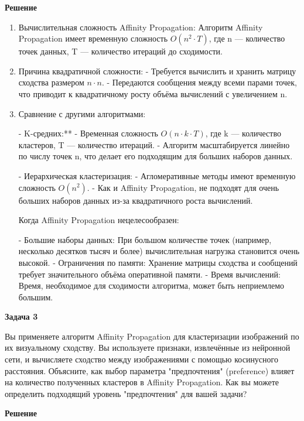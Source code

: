 \textbf{Решение}
\begin{enumerate}
    \item Вычислительная сложность Affinity Propagation: Алгоритм Affinity Propagation имеет временную сложность $O(n^2 \cdot T)$, где n — количество точек данных, T — количество итераций до сходимости.

    \item Причина квадратичной сложности:
        - Требуется вычислить и хранить матрицу сходства размером $n \cdot n$.
        - Передаются сообщения между всеми парами точек, что приводит к квадратичному росту объёма вычислений с увеличением n.

    \item Сравнение с другими алгоритмами:

- K-средних:**
  - Временная сложность $O(n \cdot k \cdot T)$, где k — количество кластеров, T — количество итераций.
  - Алгоритм масштабируется линейно по числу точек n, что делает его подходящим для больших наборов данных.

- Иерархическая кластеризация:
  - Агломеративные методы имеют временную сложность $O(n^2)$.
  - Как и Affinity Propagation, не подходят для очень больших наборов данных из-за
квадратичного роста вычислений.

Когда Affinity Propagation нецелесообразен:

- Большие наборы данных: При большом количестве точек (например, несколько десятков тысяч и более) вычислительная нагрузка становится очень высокой.
- Ограничения по памяти: Хранение матрицы сходства и сообщений требует значительного объёма оперативной памяти.
- Время вычислений: Время, необходимое для сходимости алгоритма, может быть неприемлемо большим.
\end{enumerate}


\textbf{Задача 3}

Вы применяете алгоритм Affinity Propagation для кластеризации изображений по их визуальному сходству. Вы используете признаки, извлечённые из нейронной сети, и вычисляете сходство между изображениями с помощью косинусного расстояния.
Объясните, как выбор параметра "предпочтения" (preference) влияет на количество полученных кластеров в Affinity Propagation. Как вы можете определить подходящий уровень "предпочтения" для вашей задачи?

\textbf{Решение}

